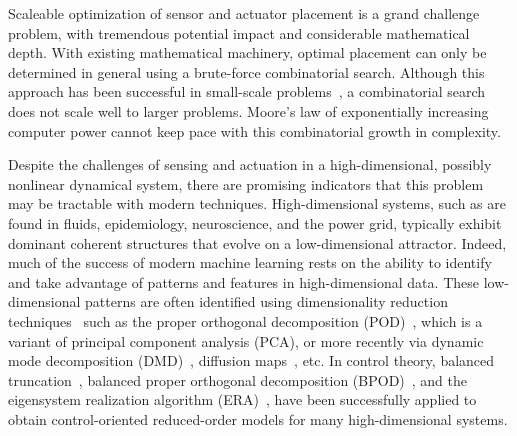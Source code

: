 \documentclass[letterpaper]{IEEEtran}
\begin{document}
Scaleable optimization of sensor and actuator placement is a grand challenge problem, with tremendous potential impact and considerable mathematical depth.  
With existing mathematical machinery, optimal placement can only be determined in general using a brute-force combinatorial search.  
Although this approach has been successful in small-scale problems~\cite{Chen:2011}, a combinatorial search does not scale well to larger problems.  Moore's law of exponentially increasing computer power cannot keep pace with this combinatorial growth in complexity.   

Despite the challenges of sensing and actuation in a high-dimensional, possibly nonlinear dynamical system, there are promising indicators that this problem may be tractable with modern techniques.  
High-dimensional systems, such as are found in fluids, epidemiology, neuroscience, and the power grid, typically exhibit dominant coherent structures that evolve on a low-dimensional attractor.  
{Indeed, much of the success of modern machine learning rests on the ability to identify and take advantage of patterns and features in high-dimensional data.  }
These low-dimensional patterns are often identified using dimensionality reduction techniques~\cite{Kutz:2013} such as the proper orthogonal decomposition (POD)~\cite{Sirovich:1987,berkooz1993proper,HLBR_turb}, which is a variant of principal component analysis (PCA), or more recently via dynamic mode decomposition (DMD)~\cite{Schmid2010jfm,Rowley2009jfm,Tu2014jcd,Kutz2016book}, diffusion maps~\cite{Coifman2005pnas,Coifman2006acha,Coifman2008mmas}, etc.   
In control theory, balanced truncation~\cite{Moore1981ieeetac}, balanced proper orthogonal decomposition (BPOD)~\cite{Willcox2002aiaaj,Rowley2005ijbc}, and the eigensystem realization algorithm (ERA)~\cite{ERA:1985}, have been successfully applied to obtain control-oriented reduced-order models for many high-dimensional systems.  
\end{document}
